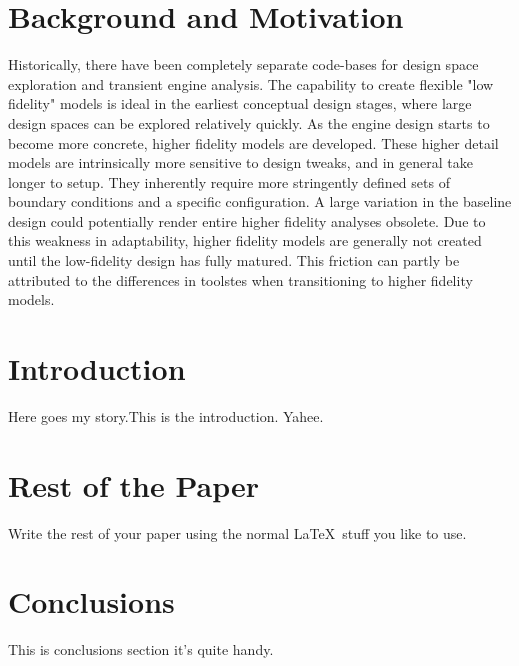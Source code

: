\documentclass[heading.tex]{subfiles}
\begin{document}

\section{Background and Motivation}
Historically, there have been completely separate code-bases for design space exploration and transient engine analysis. The capability to create flexible "low fidelity" models is ideal in the earliest  conceptual design stages, where large design spaces can be explored relatively quickly. As the engine design starts to become more concrete, higher fidelity models are developed. These higher detail models are intrinsically more sensitive to design tweaks, and in general take longer to setup. They inherently require more stringently defined sets of boundary conditions and a specific configuration. A large variation in the baseline design could potentially render entire higher fidelity analyses obsolete. Due to this weakness in adaptability, higher fidelity models are generally not created until the low-fidelity design has fully matured. This friction can partly be attributed to the differences in toolstes when transitioning to higher fidelity models. 

\section{Introduction}
Here goes my story.This is the introduction.
Yahee.

\section{Rest of the Paper}
Write the rest of your paper using the normal \LaTeX\ stuff you like to
use.

\section{Conclusions}
This is conclusions section it's quite handy.
\end{document}
